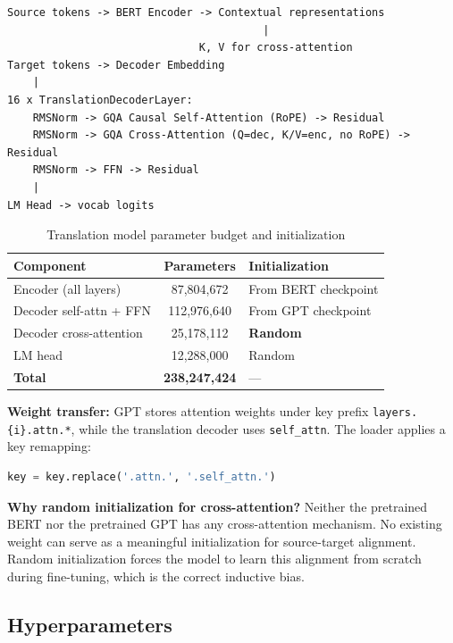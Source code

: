 \documentclass[12pt,a4paper]{article}
\begin{document}
\begin{lstlisting}[caption={Encoder-decoder translation model}]
Source tokens -> BERT Encoder -> Contextual representations
                                        |
                              K, V for cross-attention
Target tokens -> Decoder Embedding
    |
16 x TranslationDecoderLayer:
    RMSNorm -> GQA Causal Self-Attention (RoPE) -> Residual
    RMSNorm -> GQA Cross-Attention (Q=dec, K/V=enc, no RoPE) -> Residual
    RMSNorm -> FFN -> Residual
    |
LM Head -> vocab logits
\end{lstlisting}

\begin{table}[H]
\centering
\caption{Translation model parameter budget and initialization}
\label{tab:translation_params}
\begin{tabular}{lcl}
\toprule
\textbf{Component} & \textbf{Parameters} & \textbf{Initialization} \\
\midrule
Encoder (all layers) & 87,804,672 & From BERT checkpoint \\
Decoder self-attn + FFN & 112,976,640 & From GPT checkpoint \\
Decoder cross-attention & 25,178,112 & \textbf{Random} \\
LM head & 12,288,000 & Random \\
\midrule
\textbf{Total} & \textbf{238,247,424} & — \\
\bottomrule
\end{tabular}
\end{table}

\textbf{Weight transfer:} GPT stores attention weights under key prefix \texttt{layers.\{i\}.attn.*}, while the translation decoder uses \texttt{self\_attn}. The loader applies a key remapping:
\begin{lstlisting}[language=python]
key = key.replace('.attn.', '.self_attn.')
\end{lstlisting}

\textbf{Why random initialization for cross-attention?} Neither the pretrained BERT nor the pretrained GPT has any cross-attention mechanism. No existing weight can serve as a meaningful initialization for source-target alignment. Random initialization forces the model to learn this alignment from scratch during fine-tuning, which is the correct inductive bias.

\subsection{Hyperparameters}
\end{document}
